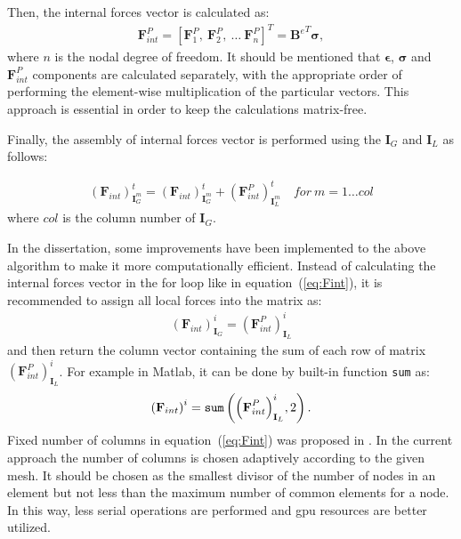 Then, the internal forces vector is calculated as:
\begin{eqnarray}
	\label{eq:forces}
	\textbf{F}^P_{int}=\left[\textbf{F}^P_1,\ \textbf{F}^P_2,\ \ldots\ \textbf{F}^P_{n} \right]^T={\textbf{B}^e}^T\boldsymbol{\sigma},
\end{eqnarray}
where $n$ is the nodal degree of freedom.
It should be mentioned that \(\boldsymbol{\epsilon}\), \(\boldsymbol{\sigma}\) and \(\textbf{F}^P_{int}\) components are calculated separately, with the appropriate order of performing the element-wise multiplication of the particular vectors.
This approach is essential in order to keep the calculations matrix-free.

Finally, the assembly of internal forces vector is performed using the \(\textbf{I}_G\) and \(\textbf{I}_L\) as follows:

\begin{eqnarray}
	\label{eq:Fint}
	{\left(\textbf{F}_{int}\right)}^t_{\textbf{I}^m_G} = {\left(\textbf{F}_{int}\right)}^t_{\textbf{I}^m_G} + {\left(\textbf{F}^P_{int}\right)}^t_{\textbf{I}^m_L}\quad for\ m=1\ldots col 
\end{eqnarray}
where \(col\) is the column number of \(\textbf{I}_G\).

In the dissertation, some improvements have been implemented to the above algorithm to make it more computationally efficient.
Instead of calculating the internal forces vector in the for loop like in equation~(\ref{eq:Fint}), it is recommended to assign all local forces into the matrix as:
\begin{eqnarray}
	\label{eq:Fmatrix}
	{\left(\textbf{F}_{int}\right)}^i_{\textbf{I}_G} ={\left(\textbf{F}^P_{int}\right)}^i_{\textbf{I}_L}
\end{eqnarray}
and then return the column vector containing the sum of each row of matrix \({\left(\textbf{F}^P_{int}\right)}^i_{\textbf{I}_L}\).
For example in Matlab, it can be done by built-in function \verb|sum| as:
\begin{eqnarray}
	\label{eq:Fsum}
	{\left(\textbf{F}_{int}\right)}^i = \verb|sum| \left({\left(\textbf{F}^P_{int}\right)}^i_{\textbf{I}_L},2\right).
\end{eqnarray}
Fixed number of columns in equation~(\ref{eq:Fint}) was proposed in \cite{kudela2016parallel}. In the current approach the number of columns is chosen adaptively according to the given mesh.
It should be chosen as the smallest divisor of the number of nodes in an element but not less than the maximum number of common elements for a node.
In this way, less serial operations are performed and \ac{gpu} resources are better utilized.

